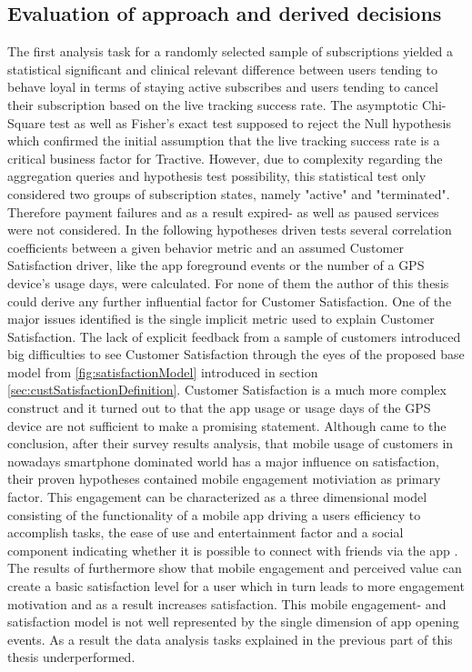\subsection{Evaluation of approach and derived decisions}
The first analysis task for a randomly selected sample of subscriptions yielded a statistical significant and clinical relevant difference between users tending to behave loyal in terms of staying active subscribes and users tending to cancel their subscription based on the live tracking success rate. The asymptotic Chi-Square test as well as Fisher's exact test supposed to reject the Null hypothesis which confirmed the initial assumption that the live tracking success rate is a critical business factor for Tractive. However, due to complexity regarding the aggregation queries and hypothesis test possibility, this statistical test only considered two groups of subscription states, namely "active" and "terminated". Therefore payment failures and as a result expired- as well as paused services were not considered. In the following hypotheses driven tests several correlation coefficients between a given behavior metric and an assumed Customer Satisfaction driver, like the app foreground events or the number of a GPS device's usage days, were calculated. For none of them the author of this thesis could derive any further influential factor for Customer Satisfaction. One of the major issues identified is the single implicit metric used to explain Customer Satisfaction. The lack of explicit feedback from a sample of customers introduced big difficulties to see Customer Satisfaction through the eyes of the proposed base model from \ref{fig:satisfactionModel} introduced in section \ref{sec:custSatisfactionDefinition}. Customer Satisfaction is a much more complex construct and it turned out to that the app usage or usage days of the GPS device are not sufficient to make a promising statement. Although \cite{kim2013study} came to the conclusion, after their survey results analysis, that mobile usage of customers in nowadays smartphone dominated world has a major influence on satisfaction, their proven hypotheses contained mobile engagement motiviation as primary factor. This engagement can be characterized as a three dimensional model consisting of the functionality of a mobile app driving a users efficiency to accomplish tasks, the ease of use and entertainment factor and a social component indicating whether it is possible to connect with friends via the app \cite{VARNALI2010144}. The results of \cite{kim2013study} furthermore show that mobile engagement and perceived value can create a basic satisfaction level for a user which in turn leads to more engagement motivation and as a result increases satisfaction. This mobile engagement- and satisfaction model is not well represented by the single dimension of app opening events. As a result the data analysis tasks explained in the previous part of this thesis underperformed.

